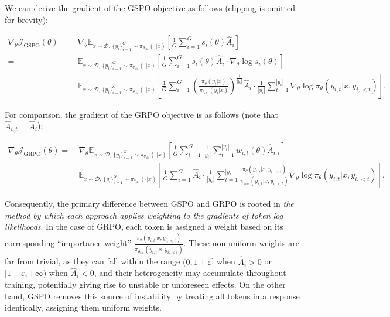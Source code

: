 We can derive the gradient of the GSPO objective as follows (clipping is omitted for brevity):

\begin{align}
\nabla_{\theta} \mathcal{J}_\text{GSPO} (\theta)
=&\ 
\nabla_{\theta} \mathbb{E}_{ x \sim \mathcal{D},\, \{y_i\}_{i=1}^G \sim \pi_{\theta_\text{old}}( \cdot | x) }
\left[ 
\frac{1}{G} \sum_{i=1}^{G} s_{i}(\theta) \widehat{A}_{i}
\right] \\
= &\ 
\mathbb{E}_{ x \sim \mathcal{D},\, \{y_i\}_{i=1}^G \sim \pi_{\theta_\text{old}}( \cdot | x) }
\left[ 
\frac{1}{G} \sum_{i=1}^{G}
s_{i}(\theta) \widehat{A}_{i}
\cdot \nabla_{\theta} \log s_{i}(\theta)
\right] \\
=&\ 
\mathbb{E}_{ x \sim \mathcal{D},\, \{y_i\}_{i=1}^G \sim \pi_{\theta_\text{old}}( \cdot | x) }
\left[ 
\frac{1}{G} \sum_{i=1}^{G} 
\left( \frac{ \pi_{\theta} (y_i | x) }{ \pi_{\theta_\text{old}} (y_i | x)} \right)^{\frac{1}{|y_i|}} \widehat{A}_{i} 
\cdot \frac{1}{|y_i|} \sum_{t=1}^{|y_i|} \nabla_{\theta} \log \pi_{\theta} (y_{i,t} | x, y_{i,<t}) 
\right].
\label{equ:gspo_grad}
\end{align}

For comparison, the gradient of the GRPO objective is as follows (note that $\widehat{A}_{i,t} = \widehat{A}_{i}$):

\begin{align}
\nabla_{\theta} \mathcal{J}_\text{GRPO} (\theta) 
=&\ 
\nabla_{\theta} \mathbb{E}_{ x \sim \mathcal{D},\, \{y_i\}_{i=1}^G \sim \pi_{\theta_\text{old}}( \cdot | x) }
\left[ \frac{1}{G} \sum_{i=1}^{G} \frac{1}{|y_i|} \sum_{t=1}^{|y_i|} 
w_{i,t}(\theta) \widehat{A}_{i,t}
\right] \\
=&\
\mathbb{E}_{ x \sim \mathcal{D},\, \{y_i\}_{i=1}^G \sim \pi_{\theta_\text{old}}( \cdot | x) }
\left[ \frac{1}{G} \sum_{i=1}^{G} \widehat{A}_{i} 
\cdot \frac{1}{|y_i|} \sum_{t=1}^{|y_i|} 
\frac{ \pi_{\theta} (y_{i,t} | x, y_{i,<t}) }{ \pi_{\theta_\text{old}} (y_{i,t} | x,y_{i,<t})} 
\nabla_{\theta} \log \pi_{\theta} (y_{i,t} | x, y_{i,<t})  
\right].
\end{align}

Consequently, the primary difference between GSPO and GRPO is rooted in \textit{the method by which each approach applies weighting to the gradients of token log likelihoods}. In the case of GRPO, each token is assigned a weight based on its corresponding ``importance weight'' $\frac{ \pi_{\theta} (y_{i,t} | x, y_{i,<t}) }{ \pi_{\theta_\text{old}} (y_{i,t} | x,y_{i,<t})}$. These non-uniform weights are far from trivial, as they can fall within the range $(0, 1+\varepsilon]$ when $\widehat{A}_{i} > 0$ or $[1-\varepsilon, +\infty)$ when $\widehat{A}_{i} < 0$, and their heterogeneity may accumulate throughout training, potentially giving rise to unstable or unforeseen effects. On the other hand, GSPO removes this source of instability by treating all tokens in a response identically, assigning them uniform weights.

